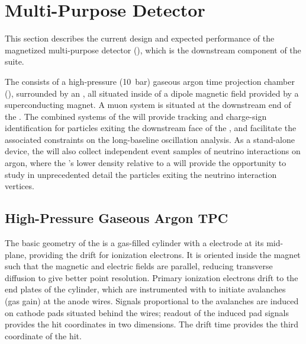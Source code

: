 	


\section{Multi-Purpose Detector}
\label{sec:exsum-nd-mpt}
%

This section describes the current design and expected performance of the magnetized multi-purpose detector (), which is the downstream component of the    suite.

The  consists of a high-pressure (10~bar) gaseous argon time projection chamber (), surrounded by an , all situated inside of a dipole magnetic field provided by a superconducting magnet. A muon system is situated at the downstream end of the . The combined systems of the  will provide tracking and charge-sign identification for particles exiting the downstream face of the  , and facilitate the associated constraints on the long-baseline oscillation analysis. As a stand-alone device, the  will also collect independent event samples of neutrino interactions on argon, where the 's lower density relative to a  will provide the opportunity to study in unprecedented detail the particles exiting the neutrino interaction vertices.


\subsection{High-Pressure Gaseous Argon TPC}
The basic geometry of the  is a gas-filled cylinder with a  electrode at its mid-plane, providing the drift \efield for ionization electrons. It is oriented inside the magnet such that the magnetic and electric fields are parallel, reducing transverse diffusion to give better point resolution. Primary ionization electrons drift to the end plates of the cylinder, which are instrumented with  to initiate avalanches (gas gain) at the anode wires.  Signals proportional to the avalanches are induced on cathode pads situated behind the wires; readout of the induced pad signals provides the hit coordinates in two dimensions.  The drift time provides the third coordinate of the hit.

